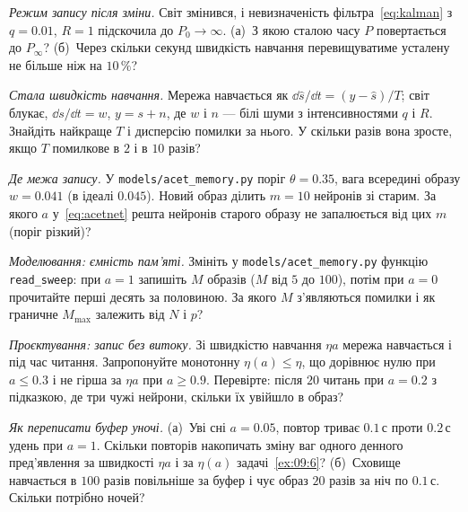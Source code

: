 \begin{exercise}[\lvlB]
\label{ex:09:2}
\emph{Режим запису після зміни.} Світ змінився, і невизначеність фільтра~\eqref{eq:kalman} з $q=0.01$, $R=1$ підскочила до $P_0\to\infty$. (а)~З якою сталою часу $P$ повертається до $P_\infty$? (б)~Через скільки секунд швидкість навчання перевищуватиме усталену не більше ніж на $10\,\%$?
\end{exercise}

\begin{exercise}[\lvlB]
\label{ex:09:3}
\emph{Стала швидкість навчання.} Мережа навчається як $\dd\hat s/\dd t=(y-\hat s)/T$; світ блукає, $\dd s/\dd t=w$, $y=s+n$, де $w$ і $n$ --- білі шуми з інтенсивностями $q$ і $R$. Знайдіть найкраще $T$ і дисперсію помилки за нього. У скільки разів вона зросте, якщо $T$ помилкове в $2$ і в $10$ разів?
\end{exercise}

\begin{exercise}[\lvlB]
\label{ex:09:4}
\emph{Де межа запису.} У \texttt{models/\allowbreak acet\_memory.py} поріг $\theta=0.35$, вага всередині образу $w=0.041$ (в ідеалі $0.045$). Новий образ ділить $m=10$ нейронів зі старим. За якого $a$ у~\eqref{eq:acetnet} решта нейронів старого образу не запалюється від цих $m$ (поріг різкий)?
\end{exercise}

\begin{exercise}[\lvlB]
\label{ex:09:5}
\emph{Моделювання: ємність пам'яті.} Змініть у \texttt{models/\allowbreak acet\_memory.py} функцію \texttt{read\_sweep}: при $a=1$ запишіть $M$ образів ($M$ від $5$ до $100$), потім при $a=0$ прочитайте перші десять за половиною. За якого $M$ з'являються помилки і як граничне $M_{\max}$ залежить від $N$ і $p$?
\end{exercise}

\begin{exercise}[\lvlB]
\label{ex:09:6}
\emph{Проєктування: запис без витоку.} Зі швидкістю навчання $\eta a$ мережа навчається і під час читання. Запропонуйте монотонну $\eta(a)\le\eta$, що дорівнює нулю при $a\le0.3$ і не гірша за $\eta a$ при $a\ge0.9$. Перевірте: після $20$ читань при $a=0.2$ з підказкою, де три чужі нейрони, скільки їх увійшло в образ?
\end{exercise}

\begin{exercise}[\lvlC]
\label{ex:09:7}
\emph{Як переписати буфер уночі.} (а)~Уві сні $a=0.05$, повтор триває $0.1\,\text{с}$ проти $0.2\,\text{с}$ удень при $a=1$. Скільки повторів накопичать зміну ваг одного денного пред'явлення за швидкості $\eta a$ і за $\eta(a)$ задачі~\ref{ex:09:6}? (б)~Сховище навчається в $100$ разів повільніше за буфер і чує образ $20$ разів за ніч по $0.1\,\text{с}$. Скільки потрібно ночей?
\end{exercise}
